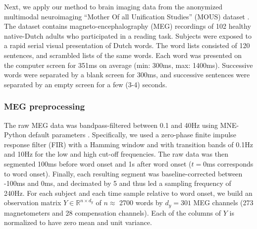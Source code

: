 
Next, we apply our method to brain imaging data from the anonymized multimodal
neuroimaging ``Mother Of all Unification Studies'' (MOUS) dataset
\citep{schoffelen2019204}. The dataset contains magneto-encephalography (MEG)
recordings of 102 healthy native-Dutch adults who participated in a reading
task.
%
Subjects were exposed to a rapid serial visual presentation of Dutch words. The
word lists consisted of 120 sentences, and scrambled lists of the same words.
Each word was presented on the computer screen for 351ms on average (min: 300ms,
max: 1400ms). Successive words were separated by a blank screen for 300ms, and
successive sentences were separated by an empty screen for a few (3-4) seconds.

\subsubsection{MEG preprocessing}

The raw MEG data was bandpass-filtered between 0.1 and 40Hz using MNE-Python
default parameters \citep{gramfort2013meg, gramfort2014mne}. Specifically, we used a zero-phase finite impulse
response filter (FIR) with a Hamming window and with transition bands of 0.1Hz
and 10Hz for the low and high cut-off frequencies. The raw data was then segmented 100ms before word onset and 1s after
word onset ($t=0$ms corresponds to word onset). Finally, each resulting
segment was baseline-corrected between -100ms and 0ms, and decimated by 5 and
thus led a sampling frequency of 240Hz.
For each subject and each time sample relative to word onset, we
build an observation matrix $Y \in \mathbb{R}^{n \times d_y}$ of $n\approx$ 2700 words
by $d_y=301$ MEG channels (273 magnetometers and 28 compensation channels). Each
of the columns of $Y$ is normalized to have zero mean and unit variance.

